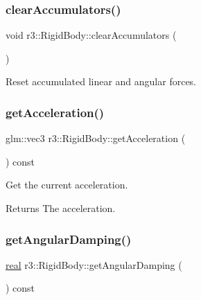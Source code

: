 \subsubsection{\texorpdfstring{clear\+Accumulators()}{clearAccumulators()}}
{\footnotesize\ttfamily void r3\+::\+Rigid\+Body\+::clear\+Accumulators (\begin{DoxyParamCaption}{ }\end{DoxyParamCaption})}



Reset accumulated linear and angular forces. 

\mbox{\label{classr3_1_1_rigid_body_aa763cbd71d2ba60cc45540854d3ecf9b}} 
\subsubsection{\texorpdfstring{get\+Acceleration()}{getAcceleration()}}
{\footnotesize\ttfamily glm\+::vec3 r3\+::\+Rigid\+Body\+::get\+Acceleration (\begin{DoxyParamCaption}{ }\end{DoxyParamCaption}) const}



Get the current acceleration. 

\begin{DoxyReturn}{Returns}
The acceleration. 
\end{DoxyReturn}
\mbox{\label{classr3_1_1_rigid_body_afcef73f6bf5ad38780f39c8ebb5c4af1}} 
\subsubsection{\texorpdfstring{get\+Angular\+Damping()}{getAngularDamping()}}
{\footnotesize\ttfamily \mbox{\hyperlink{namespacer3_ab2016b3e3f743fb735afce242f0dc1eb}{real}} r3\+::\+Rigid\+Body\+::get\+Angular\+Damping (\begin{DoxyParamCaption}{ }\end{DoxyParamCaption}) const}




